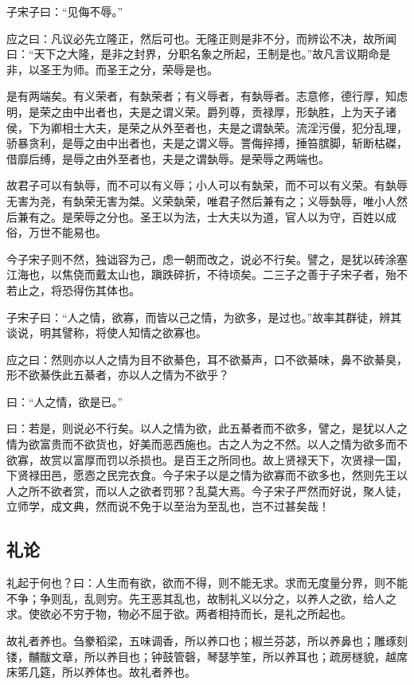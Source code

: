 \documentclass[]{article}
\begin{document}
子宋子曰：``见侮不辱。''

应之曰：凡议必先立隆正，然后可也。无隆正则是非不分，而辨讼不决，故所闻曰：``天下之大隆，是非之封界，分职名象之所起，王制是也。''故凡言议期命是非，以圣王为师。而圣王之分，荣辱是也。

是有两端矣。有义荣者，有埶荣者；有义辱者，有埶辱者。志意修，德行厚，知虑明，是荣之由中出者也，夫是之谓义荣。爵列尊，贡禄厚，形埶胜，上为天子诸侯，下为卿相士大夫，是荣之从外至者也，夫是之谓埶荣。流淫污僈，犯分乱理，骄暴贪利，是辱之由中出者也，夫是之谓义辱。詈侮捽搏，捶笞膑脚，斩断枯磔，借靡后缚，是辱之由外至者也，夫是之谓埶辱。是荣辱之两端也。

故君子可以有埶辱，而不可以有义辱；小人可以有埶荣，而不可以有义荣。有埶辱无害为尧，有埶荣无害为桀。义荣埶荣，唯君子然后兼有之；义辱埶辱，唯小人然后兼有之。是荣辱之分也。圣王以为法，士大夫以为道，官人以为守，百姓以成俗，万世不能易也。

今子宋子则不然，独诎容为己，虑一朝而改之，说必不行矣。譬之，是犹以砖涂塞江海也，以焦侥而戴太山也，蹎跌碎折，不待顷矣。二三子之善于子宋子者，殆不若止之，将恐得伤其体也。

子宋子曰：``人之情，欲寡，而皆以己之情，为欲多，是过也。''故率其群徒，辨其谈说，明其譬称，将使人知情之欲寡也。

应之曰：然则亦以人之情为目不欲綦色，耳不欲綦声，口不欲綦味，鼻不欲綦臭，形不欲綦佚此五綦者，亦以人之情为不欲乎？

曰：``人之情，欲是已。''

曰：若是，则说必不行矣。以人之情为欲，此五綦者而不欲多，譬之，是犹以人之情为欲富贵而不欲货也，好美而恶西施也。古之人为之不然。以人之情为欲多而不欲寡，故赏以富厚而罚以杀损也。是百王之所同也。故上贤禄天下，次贤禄一国，下贤禄田邑，愿悫之民完衣食。今子宋子以是之情为欲寡而不欲多也，然则先王以人之所不欲者赏，而以人之欲者罚邪？乱莫大焉。今子宋子严然而好说，聚人徒，立师学，成文典，然而说不免于以至治为至乱也，岂不过甚矣哉！

\hypertarget{header-n84}{%
\subsection{礼论}\label{header-n84}}

礼起于何也？曰：人生而有欲，欲而不得，则不能无求。求而无度量分界，则不能不争；争则乱，乱则穷。先王恶其乱也，故制礼义以分之，以养人之欲，给人之求。使欲必不穷于物，物必不屈于欲。两者相持而长，是礼之所起也。

故礼者养也。刍豢稻梁，五味调香，所以养口也；椒兰芬苾，所以养鼻也；雕琢刻镂，黼黻文章，所以养目也；钟鼓管磬，琴瑟竽笙，所以养耳也；疏房檖貌，越席床笫几筵，所以养体也。故礼者养也。
\end{document}
